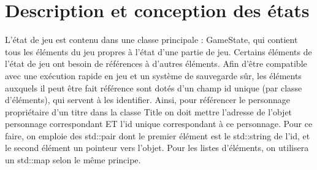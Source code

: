 \documentclass[a4paper,12pt]{article}
\begin{document}
\clearpage
\section{Description et conception des états}

L'état de jeu est contenu dans une classe principale : GameState, qui contient tous les éléments du jeu propres à l'état d'une partie de jeu.
Certains éléments de l'état de jeu ont besoin de références à d'autres éléments. Afin d'être compatible avec une exécution rapide en jeu et un système de sauvegarde sûr, les éléments auxquels il peut être fait référence sont dotés d'un champ id unique (par classe d'éléments), qui servent à les identifier. Ainsi, pour référencer le personnage propriétaire d'un titre dans la classe Title on doit mettre l'adresse de l'objet personnage correspondant ET l'id unique correspondant à ce personnage. Pour ce faire, on emploie des std::pair dont le premier élément est le std::string de l'id, et le second élément un pointeur vers l'objet. Pour les listes d'éléments, on utilisera un std::map selon le même principe.
\end{document}
